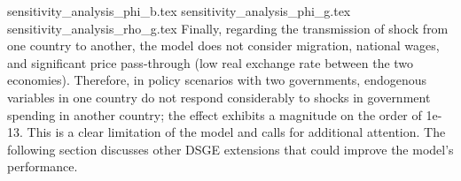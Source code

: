\newpage
{sensitivity_analysis_phi_b.tex}
\newpage
{sensitivity_analysis_phi_g.tex}
\newpage
{sensitivity_analysis_rho_g.tex}
Finally, regarding the transmission of shock from one country to another, the model does not consider migration, national wages, and significant price pass-through (low real exchange rate between the two economies). Therefore, in policy scenarios with two governments, endogenous variables in one country do not respond considerably to shocks in government spending in another country; the effect exhibits a magnitude on the order of 1e-13. This is a clear limitation of the model and calls for additional attention. The following section discusses other DSGE extensions that could improve the model's performance.
